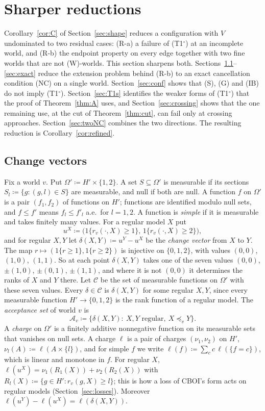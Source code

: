 \documentclass[11pt]{article}
\theoremstyle{definition}\newtheorem{definition}[theorem]{Definition}
\theoremstyle{remark}\newtheorem{remark}[theorem]{Remark}
\newcommand{\To}{\textup{(T1$^\circ$)}}
\begin{document}
\section{Sharper reductions}\label{sec:sharp}

Corollary~\ref{cor:C} of Section~\ref{sec:shape} reduces a configuration
with $V$ undominated to two residual cases: (R-a) a failure of \To{} at an
incomplete world, and (R-b) the endpoint property on every edge together
with two fine worlds that are not (W)-worlds. This section sharpens both.
Sections~\ref{sec:NCsetup}--\ref{sec:exact} reduce the extension problem
behind (R-b) to an exact cancellation condition (NC) on a single world.
Section~\ref{sec:conf} shows that (S), (G) and (IB) do not imply \To.
Section~\ref{sec:T1s} identifies the weaker forms of \To{} that the proof of
Theorem~\ref{thm:A} uses, and Section~\ref{sec:crossing} shows that the one
remaining use, at the cut of Theorem~\ref{thm:cut}, can fail only at
crossing approaches. Section~\ref{sec:twoNC} combines the two directions.
The resulting reduction is Corollary~\ref{cor:refined}.

\subsection{Change vectors}\label{sec:NCsetup}

Fix a world $v$. Put $\Omega'\coloneqq H'\times\{1,2\}$. A set
$S\subseteq\Omega'$ is measurable if its sections $S_l\coloneqq\{g:(g,l)\in
S\}$ are measurable, and null if both are null. A function $f$ on $\Omega'$
is a pair $(f_1,f_2)$ of functions on $H'$; functions are identified modulo
null sets, and $f\le f'$ means $f_l\le f'_l$ a.e.\ for $l=1,2$. A function is
\emph{simple} if it is measurable and takes finitely many values. For a
regular model $X$ put
\[
 u^X\coloneqq\bigl(1\{r_v(\cdot,X)\ge1\},\,1\{r_v(\cdot,X)\ge2\}\bigr),
\]
and for regular $X,Y$ let $\delta(X,Y)\coloneqq u^Y-u^X$ be the
\emph{change vector} from $X$ to $Y$. The map $r\mapsto(1\{r\ge1\},1\{r\ge
2\})$ is injective on $\{0,1,2\}$, with values $(0,0)$, $(1,0)$, $(1,1)$. So
at each point $\delta(X,Y)$ takes one of the seven values $(0,0)$,
$\pm(1,0)$, $\pm(0,1)$, $\pm(1,1)$, and where it is not $(0,0)$ it
determines the ranks of $X$ and $Y$ there. Let $\mathcal C$ be the set of
measurable functions on $\Omega'$ with these seven values. Every
$\delta\in\mathcal C$ is $\delta(X,Y)$ for some regular $X,Y$, since every
measurable function $H'\to\{0,1,2\}$ is the rank function of a regular
model. The \emph{acceptance set} of world $v$ is
\[
 \mathcal A_v\coloneqq\{\delta(X,Y):\ X,Y\text{ regular},\ X\preceq_vY\}.
\]
A \emph{charge} on $\Omega'$ is a finitely additive nonnegative function on
its measurable sets that vanishes on null sets. A charge $\ell$ is a pair of
charges $(\nu_1,\nu_2)$ on $H'$, $\nu_l(A)\coloneqq\ell(A\times\{l\})$, and
for simple $f$ we write $\ell(f)\coloneqq\sum_c c\,\ell(\{f=c\})$, which is
linear and monotone in $f$. For regular $X$,
$\ell(u^X)=\nu_1(R_1(X))+\nu_2(R_2(X))$ with $R_l(X)\coloneqq\{g\in
H':r_v(g,X)\ge l\}$; this is how a loss of CBOI's form acts on regular
models (Section~\ref{sec:losses}). Moreover $\ell(u^Y)-\ell(u^X)=
\ell(\delta(X,Y))$.
\end{document}
